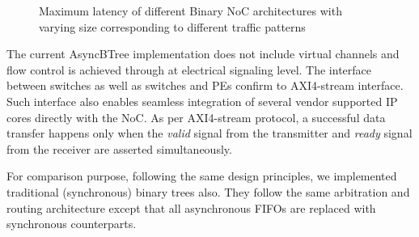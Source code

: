 \begin{figure}[t]
\centering     %
{}
\vspace{-3mm}
\caption{Maximum latency of different Binary NoC architectures with varying size corresponding to different traffic patterns}
\label{fig:latency}
\vspace{-5mm}
\end{figure}


The current AsyncBTree implementation does not include virtual channels and flow control is achieved through at electrical signaling level.
The interface between switches as well as switches and PEs confirm to AXI4-stream interface.
Such interface also enables seamless integration of several vendor supported IP cores directly with the NoC.
As per AXI4-stream protocol, a successful data transfer happens only when the \emph{valid} signal from the transmitter and \emph{ready} signal from the receiver are asserted simultaneously.

For comparison purpose, following the same design principles, we implemented traditional (synchronous) binary trees also.
They follow the same arbitration and routing architecture except that all asynchronous FIFOs are replaced with synchronous counterparts.